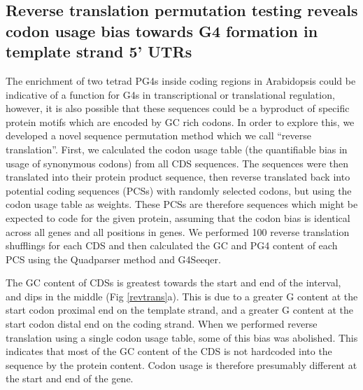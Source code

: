 \documentclass[12pt,a4paper,]{report}
\begin{document}
\newpage

\hypertarget{reverse-translation-permutation-testing-reveals-codon-usage-bias-towards-g4-formation-in-template-strand-5-utrs}{%
\subsection{Reverse translation permutation testing reveals codon usage
bias towards G4 formation in template strand 5'
UTRs}\label{reverse-translation-permutation-testing-reveals-codon-usage-bias-towards-g4-formation-in-template-strand-5-utrs}}

The enrichment of two tetrad PG4s inside coding regions in Arabidopsis
could be indicative of a function for G4s in transcriptional or
translational regulation, however, it is also possible that these
sequences could be a byproduct of specific protein motifs which are
encoded by GC rich codons. In order to explore this, we developed a
novel sequence permutation method which we call ``reverse translation''.
First, we calculated the codon usage table (the quantifiable bias in
usage of synonymous codons) from all CDS sequences. The sequences were
then translated into their protein product sequence, then reverse
translated back into potential coding sequences (PCSs) with randomly
selected codons, but using the codon usage table as weights. These PCSs
are therefore sequences which might be expected to code for the given
protein, assuming that the codon bias is identical across all genes and
all positions in genes. We performed 100 reverse translation shufflings
for each CDS and then calculated the GC and PG4 content of each PCS
using the Quadparser method and G4Seeqer.

The GC content of CDSs is greatest towards the start and end of the
interval, and dips in the middle (Fig \ref{revtrans}a). This is due to a
greater G content at the start codon proximal end on the template
strand, and a greater G content at the start codon distal end on the
coding strand. When we performed reverse translation using a single
codon usage table, some of this bias was abolished. This indicates that
most of the GC content of the CDS is not hardcoded into the sequence by
the protein content. Codon usage is therefore presumably different at
the start and end of the gene.
\end{document}
